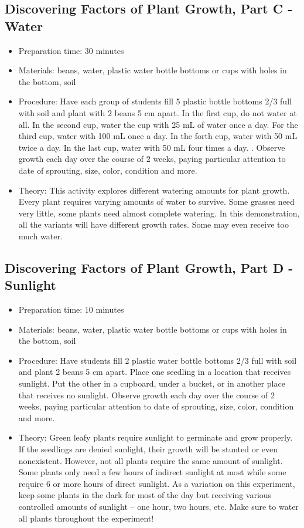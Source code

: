 \subsection{Discovering Factors of Plant Growth, Part C - Water}
\begin{itemize}
\item{Preparation time: 30 minutes}
\item{Materials: beans, water, plastic water bottle bottoms or cups with holes in the bottom, soil}
\item{Procedure: Have each group of students fill 5 plastic bottle bottoms 2/3 full with soil and plant with 2 beans 5 cm apart. In the first cup, do not water at all. In the second cup, water the cup with 25 mL of water once a day. For the third cup, water with 100 mL once a day. In the forth cup, water with 50 mL twice a day. In the last cup, water with 50 mL four times a day. . Observe growth each day over the course of 2 weeks, paying particular attention to date of sprouting, size, color, condition and more.}
\item{Theory: This activity explores different watering amounts for plant growth. Every plant requires varying amounts of water to survive. Some grasses need very little, some plants need almost complete watering. In this demonstration, all the variants will have different growth rates. Some may even receive too much water.}
\end{itemize}

\subsection{Discovering Factors of Plant Growth, Part D - Sunlight}
\begin{itemize}
\item{Preparation time: 10 minutes}
\item{Materials: beans, water, plastic water bottle bottoms or cups with holes in the bottom, soil}
\item{Procedure: Have students fill 2 plastic water bottle bottoms 2/3 full with soil and plant 2 beans 5 cm apart. Place one seedling in a location that receives sunlight. Put the other in a cupboard, under a bucket, or in another place that receives no sunlight. Observe growth each day over the course of 2 weeks, paying particular attention to date of sprouting, size, color, condition and more.}
\item{Theory: Green leafy plants require sunlight to germinate and grow properly. If the seedlings are denied sunlight, their growth will be stunted or even nonexistent. However, not all plants require the same amount of sunlight. Some plants only need a few hours of indirect sunlight at most while some require 6 or more hours of direct sunlight. As a variation on this experiment, keep some plants in the dark for most of the day but receiving various controlled amounts of sunlight – one hour, two hours, etc. Make sure to water all plants throughout the experiment!}
\end{itemize}

